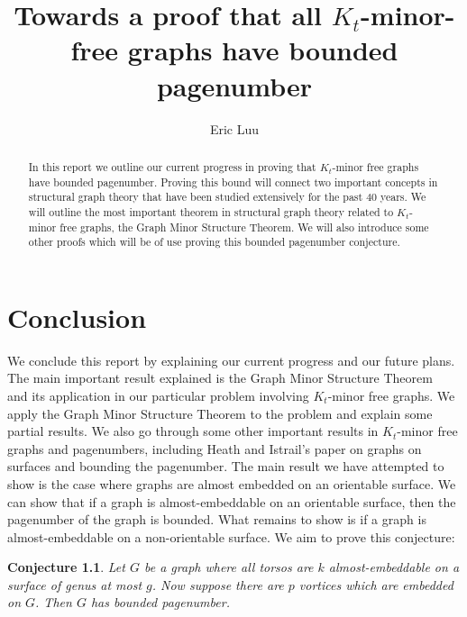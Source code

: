 \documentclass[notitlepage]{report}
\title{Towards a proof that all \(K_t\)-minor-free graphs have bounded pagenumber}
\author{Eric Luu}
\newtheorem{conjecture}[theorem]{Conjecture}
\theoremstyle{definition}
\numberwithin{theorem}{section}
\numberwithin{equation}{section}
\begin{document}
\maketitle
\begin{abstract}
	In this report we outline our current progress in proving that \(K_t\)-minor free graphs have bounded pagenumber. Proving this bound will connect two important concepts in structural graph theory that have been studied extensively for the past 40 years. We will outline the most important theorem in structural graph theory related to \(K_t\)-minor free graphs, the Graph Minor Structure Theorem. We will also introduce some other proofs which will be of use proving this bounded pagenumber conjecture.
\end{abstract}
\listoftodos

\setcounter{tocdepth}{1}
\tableofcontents














\chapter{Conclusion}\label{chap:conclusion}
We conclude this report by explaining our current progress and our future plans.
The main important result explained is the Graph Minor Structure Theorem~\cite{robertsonGraphMinorsXVI2003} and its application in our particular problem involving \(K_t\)-minor free graphs. We apply the Graph Minor Structure Theorem to the problem and explain some partial results.
We also go through some other important results in \(K_t\)-minor free graphs and pagenumbers, including Heath and Istrail's \cite{heathPagenumberGenusGraphs1992} paper on graphs on surfaces and bounding the pagenumber.
The main result we have attempted to show is the case where graphs are almost embedded on an orientable surface. We can show that if a graph is almost-embeddable on an orientable surface, then the pagenumber of the graph is bounded.
What remains to show is if a graph is almost-embeddable on a non-orientable surface.
We aim to prove this conjecture:
\begin{conjecture}
	Let $G$ be a graph where all torsos are $k$ almost-embeddable on a surface of genus at most $g$. Now suppose there are $p$ vortices which are embedded on $G$. Then $G$ has bounded pagenumber.
\end{conjecture}
\end{document}
